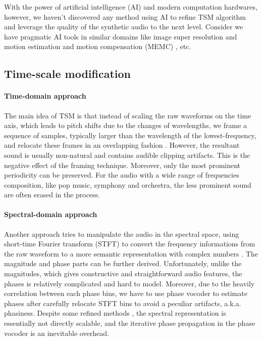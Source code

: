 \documentclass[12pt]{article}
\begin{document}
With the power of artificial intelligence (AI) and modern computation hardwares, however, we haven't discovered any method using AI to refine TSM algorithm and leverage the quality of the synthetic audio to the next level. Consider we have pragmatic AI tools in similar domains like image super resolution \cite{led17} and motion estimation and motion compensation (MEMC) \cite{bao21}, etc.

\subsection{Time-scale modification}
\paragraph{Time-domain approach}
The main idea of TSM is that instead of scaling the raw waveforms on the time axis, which leads to pitch shifts due to the changes of wavelengths, we frame a sequence of samples, typically larger than the wavelength of the lowest-frequency, and relocate these frames in an overlapping fashion \cite{hej91}\cite{eri90}\cite{ver93}. However, the resultant sound is usually non-natural and contains audible clipping artifacts. This is the negative effect of the framing technique. Moreover, only the most prominent periodicity can be preserved. For the audio with a wide range of frequencies composition, like pop music, symphony and orchestra, the less prominent sound are often erased in the process.

\paragraph{Spectral-domain approach}
Another approach tries to manipulate the audio in the spectral space, using short-time Fourier transform (STFT) to convert the frequency informations from the raw waveform to a more semantic representation with complex numbers \cite{lar99}. The magnitude and phase parts can be further derived. Unfortunately, unlike the magnitudes, which gives constructive and straightforward audio features, the phases is relatively complicated and hard to model. Moreover, due to the heavily correlation between each phase bins, we have to use phase vocoder \cite{fla66} to estimate phases after carefully relocate STFT bins to avoid a peculiar artifacts, a.k.a. phasiness. Despite some refined methods \cite{kra12}\cite{moi11}\cite{nag09}, the spectral representation is essentially not directly scalable, and the iterative phase propagation in the phase vocoder is an inevitable overhead.
\end{document}
